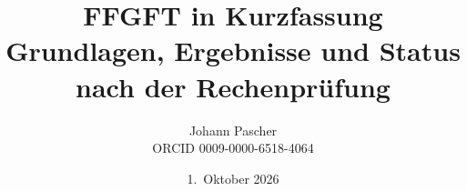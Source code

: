 \documentclass[11pt,a4paper]{report}
\title{FFGFT in Kurzfassung\\[0.5em]
  \large Grundlagen, Ergebnisse und Status nach der Rechenprüfung}
\date{1.~Oktober 2026}
\author{Johann Pascher\\\small ORCID 0009-0000-6518-4064}
\begin{document}
\renewcommand{\thechapter}{}
\renewcommand{\thesection}{\arabic{section}}
\maketitle
\tableofcontents

\end{document}
